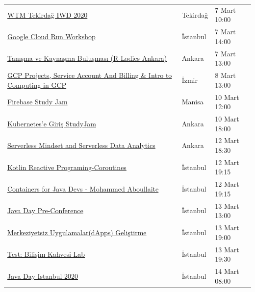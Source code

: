 \documentclass[11pt]{article}
\begin{document}
\begin{longtable}{|p{8cm}|l|l|}
\href{https://www.meetup.com/gdgtekirdag/events/268421016/}{WTM Tekirdağ IWD 2020} & Tekirdağ & 7 Mart 10:00\\
\href{https://www.meetup.com/GDG-Cloud-Istanbul/events/268749560/}{Google Cloud Run Workshop} & İstanbul & 7 Mart 14:00\\
\href{https://www.meetup.com/rladies-ankara/events/269092053/}{Tanışma ve Kaynaşma Buluşması (R-Ladies Ankara)} & Ankara & 7 Mart 13:00\\
\href{https://www.meetup.com/GDG-Cloud-Izmir/events/268749612/}{GCP Projects, Service Account And Billing \& Intro to Computing in GCP} & İzmir & 8 Mart 13:00\\
\href{https://www.meetup.com/GDG-Manisa/events/268736708/}{Firebase Study Jam} & Manisa & 10 Mart 12:00\\
\href{https://www.meetup.com/gdg-cloud-ankara/events/269089185/}{Kubernetes'e Giriş StudyJam} & Ankara & 10 Mart 18:00\\
\href{https://kommunity.com/cloud-and-serverless-turkey/events/serverless-mindset-and-serverless-data-analytics-getir-ankara}{Serverless Mindset and Serverless Data Analytics} & Ankara & 12 Mart 18:30\\
\href{https://www.meetup.com/trendyol/events/268292201/}{Kotlin Reactive Programing-Coroutines} & İstanbul & 12 Mart 19:15\\
\href{https://www.meetup.com/Facebook-Developer-Circle-Istanbul/events/269082757/}{Containers for Java Devs - Mohammed Aboullaite} & İstanbul & 12 Mart 19:15\\
\href{https://www.meetup.com/Istanbul-Java-User-Group/events/268426411/}{Java Day Pre-Conference} & İstanbul & 13 Mart 13:00\\
\href{https://kommunity.com/devnot-yazilimci-bulusmalari/events/merkeziyetsiz-uygulamalardapps-gelistirme}{Merkeziyetsiz Uygulamalar(dApps) Geliştirme} & İstanbul & 13 Mart 19:00\\
\href{https://kommunity.com/btorgtr/events/test-bilisim-kahvesi-laboratuari}{Test: Bilişim Kahvesi Lab} & İstanbul & 13 Mart 19:30\\
\href{https://www.meetup.com/Istanbul-Java-User-Group/events/267956332/}{Java Day Istanbul 2020} & İstanbul & 14 Mart 08:00\\
\hline
\end{longtable}
\end{document}
